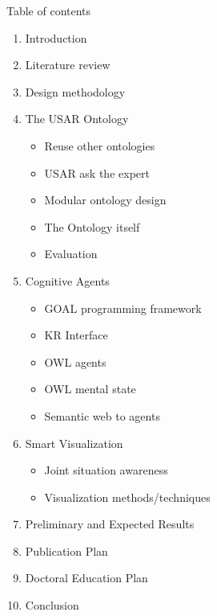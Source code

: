 Table of contents
\tableofcontents{}

\begin{enumerate}
\item Introduction
\item Literature review
\item Design methodology
\item The USAR Ontology
\begin{itemize}
\item Reuse other ontologies
\item USAR ask the expert 
\item Modular ontology design
\item The Ontology itself
\item Evaluation
\end{itemize}

\item Cognitive Agents
\begin{itemize}
\item GOAL programming framework
\item KR Interface
\item OWL agents
\item OWL mental state
\item Semantic web to agents
\end{itemize}

\item Smart Visualization
\begin{itemize}
\item Joint situation awareness
\item Visualization methods/techniques
\end{itemize}

\item Preliminary and Expected Results
\item Publication Plan
\item Doctoral Education Plan
\item Conclusion
\end{enumerate}
    
    
  
  
  
  
  